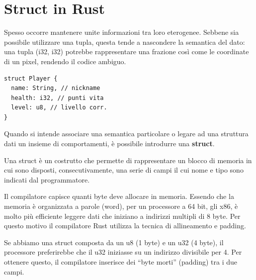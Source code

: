 \section{Struct in Rust}



\begin{center}
  \centering
  \begin{minipage}{\linewidth}
    \begin{minipage}{0.62\linewidth}
      Spesso occorre mantenere unite informazioni tra loro eterogenee. Sebbene sia
      possibile utilizzare una tupla, questa tende a nascondere la semantica del dato:
      una tupla (i32, i32) potrebbe rappresentare una frazione così come le coordinate
      di un pixel, rendendo il codice ambiguo.\newline



    \end{minipage}%
    \hfill
    \begin{minipage}{0.35\linewidth}
      \begin{verbatim}
struct Player {
  name: String, // nickname
  health: i32, // punti vita
  level: u8, // livello corr.
}
\end{verbatim}
    \end{minipage}
  \end{minipage}
\end{center}

Quando si intende associare una semantica particolare o legare ad una struttura dati un insieme di
comportamenti, è possibile introdurre una \textbf{struct}.

Una struct è un costrutto che permette di rappresentare un blocco di memoria in
cui sono disposti, consecutivamente, una serie di campi il cui nome e tipo sono
indicati dal programmatore.


Il compilatore capisce quanti byte deve allocare in memoria. Essendo che la memoria è
organizzata a parole (word), per un processore a 64 bit, gli x86, è molto più efficiente
leggere dati che iniziano a indirizzi multipli di 8 byte. Per questo motivo il compilatore
Rust utilizza la tecnica di allineamento e padding.

Se abbiamo una struct composta da un u8 (1 byte) e un u32 (4 byte), il
processore preferirebbe che il u32 iniziasse su un indirizzo divisibile per 4.
Per ottenere questo, il compilatore inserisce dei ``byte morti'' (padding) tra i
due campi.


